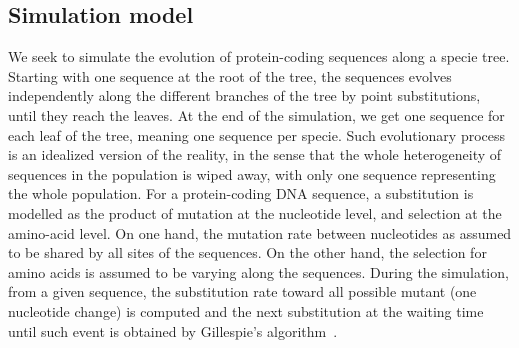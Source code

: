 \subsection{Simulation model}
\label{sec:mut-bias-simu}
We seek to simulate the evolution of protein-coding sequences along a specie tree.
Starting with one sequence at the root of the tree, the sequences evolves independently along the different branches of the tree by point substitutions, until they reach the leaves.
At the end of the simulation, we get one sequence for each leaf of the tree, meaning one sequence per specie.
Such evolutionary process is an idealized version of the reality, in the sense that the whole heterogeneity of sequences in the population is wiped away, with only one sequence representing the whole population.
For a protein-coding \acrshort{DNA} sequence, a substitution is modelled as the product of mutation at the nucleotide level, and selection at the amino-acid level.
On one hand, the mutation rate between nucleotides as assumed to be shared by all sites of the sequences.
On the other hand, the selection for amino acids is assumed to be varying along the sequences.
During the simulation, from a given sequence, the substitution rate toward all possible mutant (one nucleotide change) is computed and the next substitution at the waiting time until such event is obtained by Gillespie's algorithm~\citep{Gillespie1977}.

